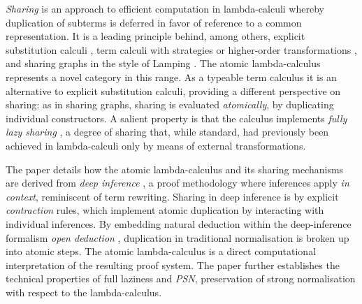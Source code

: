\documentclass[orivec]{llncs}
\begin{document}
\emph{Sharing} is an approach to efficient computation in lambda-calculi whereby duplication of subterms is deferred in favor of reference to a common representation.
%
It is a leading principle behind, among others, explicit substitution calculi \cite{Abadi-Cardelli-Curien-Levy-1991,Lescanne-1994,David-Guillaume-2001,DiCosmo-Kesner-Polonovski-2003,Kesner-Lengrand-2007,Accattoli-Kesner-2010}, term calculi with strategies or higher-order transformations \cite{Hughes-1982,Ariola-Felleisen-Maraist-Odersky-Wadler-1995}, and sharing graphs in the style of Lamping \cite{Lamping-1990,Asperti-Guerrini-1998,VanOostrom-VanDeLooij-Zwitserlood-2004}.
%
The atomic lambda-calculus represents a novel category in this range.
%
As a typeable term calculus it is an alternative to explicit substitution calculi, providing a different perspective on sharing: as in sharing graphs, sharing is evaluated \emph{atomically}, by duplicating individual constructors.
%
A salient property is that the calculus implements \emph{fully lazy sharing} \cite{Wadsworth-1971,Hughes-1982,Balabonski-2012}, a degree of sharing that, while standard, had previously been achieved in lambda-calculi only by means of external transformations.



The paper \cite{Gundersen-Heijltjes-Parigot-2013-LICS} details how the atomic lambda-calculus and its sharing mechanisms are derived from \emph{deep inference} \cite{Brunnler-Tiu-2001}, a proof methodology where inferences apply \emph{in context}, reminiscent of term rewriting.
%
Sharing in deep inference is by explicit \emph{contraction} rules, which implement atomic duplication by interacting with individual inferences.
%
By embedding natural deduction within the deep-inference formalism \emph{open deduction} \cite{Guglielmi-Gundersen-Parigot-2010}, duplication in traditional normalisation is broken up into atomic steps.
%
The atomic lambda-calculus is a direct computational interpretation of the resulting proof system.
%
The paper \cite{Gundersen-Heijltjes-Parigot-2013-LICS} further establishes the technical properties of full laziness and \emph{PSN}, preservation of strong normalisation with respect to the lambda-calculus.
\end{document}
